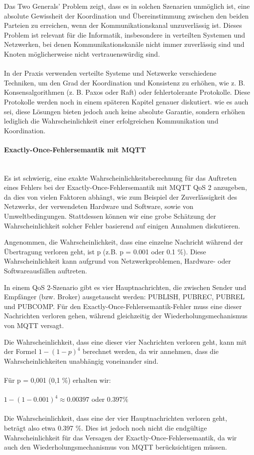 \documentclass[../vs-script-first-v01.tex]{subfiles}
\begin{document}
Das Two Generals' Problem zeigt, dass es in solchen Szenarien unmöglich ist, eine absolute Gewissheit der Koordination und Übereinstimmung zwischen den beiden Parteien zu erreichen, wenn der Kommunikationskanal unzuverlässig ist. Dieses Problem ist relevant für die Informatik, insbesondere in verteilten Systemen und Netzwerken, bei denen Kommunikationskanäle nicht immer zuverlässig sind und Knoten möglicherweise nicht vertrauenswürdig sind.
\\\\
In der Praxis verwenden verteilte Systeme und Netzwerke verschiedene Techniken, um den Grad der Koordination und Konsistenz zu erhöhen, wie z. B. Konsensalgorithmen (z. B. Paxos oder Raft) oder fehlertolerante Protokolle. Diese Protokolle werden noch in einem späteren Kapitel genauer diskutiert. wie es auch sei, diese Lösungen bieten jedoch auch keine absolute Garantie, sondern erhöhen lediglich die Wahrscheinlichkeit einer erfolgreichen Kommunikation und Koordination.

\paragraph{Exactly-Once-Fehlersemantik mit MQTT\\\\}

Es ist schwierig, eine exakte Wahrscheinlichkeitsberechnung für das Auftreten eines Fehlers bei der Exactly-Once-Fehlersemantik mit MQTT QoS 2 anzugeben, da dies von vielen Faktoren abhängt, wie zum Beispiel der Zuverlässigkeit des Netzwerks, der verwendeten Hardware und Software, sowie von Umweltbedingungen. Stattdessen können wir eine grobe Schätzung der Wahrscheinlichkeit solcher Fehler basierend auf einigen Annahmen diskutieren.

Angenommen, die Wahrscheinlichkeit, dass eine einzelne Nachricht während der Übertragung verloren geht, ist p (z.B. p = 0.001 oder 0.1 \%). Diese Wahrscheinlichkeit kann aufgrund von Netzwerkproblemen, Hardware- oder Softwareausfällen auftreten.

In einem QoS 2-Szenario gibt es vier Hauptnachrichten, die zwischen Sender und Empfänger (bzw. Broker) ausgetauscht werden: PUBLISH, PUBREC, PUBREL und PUBCOMP. Für den Exactly-Once-Fehlersemantik-Fehler muss eine dieser Nachrichten verloren gehen, während gleichzeitig der Wiederholungsmechanismus von MQTT versagt.

Die Wahrscheinlichkeit, dass eine dieser vier Nachrichten verloren geht, kann mit der Formel $1 - (1 - p)^4$ berechnet werden, da wir annehmen, dass die Wahrscheinlichkeiten unabhängig voneinander sind.
\\\\
Für p = 0,001 (0,1 \%) erhalten wir:
\\\\
$1 - (1 - 0.001)^4 \approx 0.00397$ oder $0.397 \%$
\\\\
Die Wahrscheinlichkeit, dass eine der vier Hauptnachrichten verloren geht, beträgt also etwa 0.397 \%. Dies ist jedoch noch nicht die endgültige Wahrscheinlichkeit für das Versagen der Exactly-Once-Fehlersemantik, da wir auch den Wiederholungsmechanismus von MQTT berücksichtigen müssen.
\end{document}
